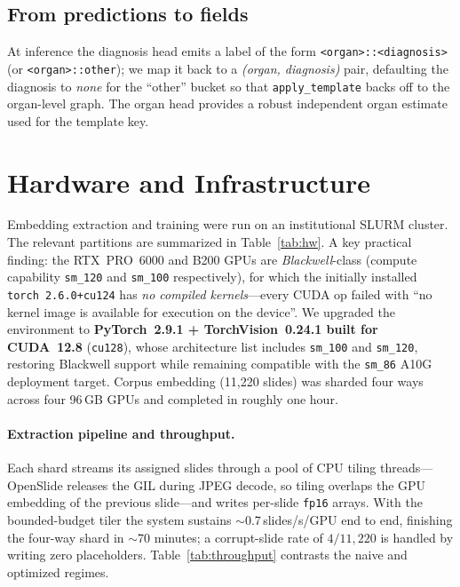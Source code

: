 \documentclass[11pt,a4paper]{article}
\newcommand{\code}[1]{\texttt{\small #1}}
\begin{document}
\subsection{From predictions to fields}
At inference the diagnosis head emits a label of the form \code{<organ>::<diagnosis>} (or
\code{<organ>::other}); we map it back to a \emph{(organ, diagnosis)} pair, defaulting the
diagnosis to \emph{none} for the ``other'' bucket so that \code{apply\_template} backs off to
the organ-level graph. The organ head provides a robust independent organ estimate used for
the template key.

\section{Hardware and Infrastructure}
\label{sec:hardware}

Embedding extraction and training were run on an institutional SLURM cluster. The relevant
partitions are summarized in Table~\ref{tab:hw}. A key practical finding: the RTX~PRO~6000 and
B200 GPUs are \emph{Blackwell}-class (compute capability \code{sm\_120} and \code{sm\_100}
respectively), for which the initially installed \code{torch~2.6.0+cu124} has \emph{no compiled
kernels}---every CUDA op failed with ``no kernel image is available for execution on the
device''. We upgraded the environment to \textbf{PyTorch~2.9.1 + TorchVision~0.24.1 built for
CUDA~12.8} (\code{cu128}), whose architecture list includes \code{sm\_100} and \code{sm\_120},
restoring Blackwell support while remaining compatible with the \code{sm\_86} A10G deployment
target. Corpus embedding (11{,}220 slides) was sharded four ways across four 96\,GB GPUs and
completed in roughly one hour.

\paragraph{Extraction pipeline and throughput.} Each shard streams its assigned slides through a
pool of CPU tiling threads---OpenSlide releases the GIL during JPEG decode, so tiling overlaps
the GPU embedding of the previous slide---and writes per-slide \code{fp16} arrays. With the
bounded-budget tiler the system sustains $\sim$0.7\,slides/s/GPU end to end, finishing the
four-way shard in $\sim$70 minutes; a corrupt-slide rate of $4/11{,}220$ is handled by writing
zero placeholders. Table~\ref{tab:throughput} contrasts the naive and optimized regimes.
\end{document}
